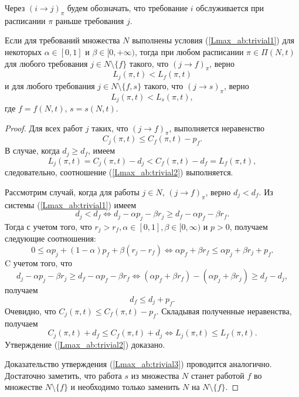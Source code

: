 Через $(i \rightarrow j)_{\pi}$ будем обозначать, что требование $i$ обслуживается при расписании $\pi$ раньше требования $j$.
\begin{lemma} \label{Lmax_ab:lm:1}
Если для требований множества $N$ выполнены условия (\ref{Lmax_ab:trivial1}) для некоторых $\alpha \in [0,1]$ и $\beta \in [0, +\infty)$, тогда при любом расписании $\pi \in \Pi(N,t)$ для любого требования $j \in N \setminus \{ f\}$ такого, что $(j \rightarrow f)_{\pi}$, верно
\begin{equation}
L_j(\pi,t) < L_f(\pi,t) \label{Lmax_ab:trivial2}
\end{equation}
и для любого требования $j \in N \setminus \{ f,s \}$ такого, что $(j \rightarrow s)_{\pi}$, верно
\begin{equation}
L_j(\pi,t) < L_s(\pi,t), \label{Lmax_ab:trivial3}
\end{equation}
где $f = f(N, t)$, $s = s(N, t)$.
\end{lemma}
\begin{proof}
Для всех работ $j$ таких, что $(j \rightarrow f)_{\pi}$, выполняется неравенство
$$C_j(\pi,t) \leq C_f(\pi,t) - p_f.$$
В случае, когда $d_j \geq d_f$, имеем
$$L_j(\pi,t) = C_j(\pi,t) - d_j < C_f(\pi,t) - d_f = L_f(\pi,t),$$
следовательно, соотношение (\ref{Lmax_ab:trivial2}) выполняется.

Рассмотрим случай, когда для работы $j \in N$, $(j \rightarrow f)_{\pi}$, верно $d_j < d_f$. Из системы (\ref{Lmax_ab:trivial1}) имеем
$$d_j < d_f \Leftrightarrow d_j - \alpha p_j -\beta r_j \geq d_f - \alpha p_f - \beta r_f.$$
Тогда с учетом того, что $r_j > r_f, \alpha \in [0,1], \beta \in [0, \infty)$ и $p > 0$, получаем следующие соотношения:
$$0 \leq \alpha p_j + (1 - \alpha) p_f + \beta (r_j - r_f) \Leftrightarrow \alpha p_f + \beta r_f \leq \alpha p_j + \beta r_j + p_f.$$
C учетом того, что
$$d_j - \alpha p_j -\beta r_j \geq d_f - \alpha p_f - \beta r_f \Leftrightarrow (\alpha p_f + \beta r_f) - (\alpha p_j + \beta r_j) \geq d_f -d_j,$$
получаем $$d_f \leq d_j + p_f.$$
Очевидно, что $ C_j(\pi,t) \leq C_f(\pi,t) - p_f$.
Складывая полученные неравенства, получаем
$$C_{j}(\pi,t) + d_f \leq C_f(\pi,t) + d_j \Leftrightarrow L_j(\pi,t) \leq L_f(\pi,t).$$
Утверждение (\ref{Lmax_ab:trivial2}) доказано.

Доказательство утверждения (\ref{Lmax_ab:trivial3}) проводится аналогично. Достаточно заметить, что работа $s$ из множества $N$ станет работой $f$ во множестве $N \setminus \{f\}$ и необходимо только заменить $N$ на $N \setminus \{f\}$.
\end{proof}

